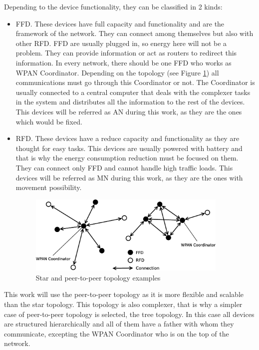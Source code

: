 Depending to the device functionality, they can be classified in 2 kinds:

\begin{itemize}
 \item \acl{FFD}. These devices have full capacity and functionality and are the framework of the network. They can connect 
among themselves but also with other \ac{RFD}. \ac{FFD} are usually plugged in, so energy here will not be a problem. They can provide 
information or act as routers to redirect this information. In every network, there should be one \ac{FFD} who works as \ac{WPAN}
Coordinator. Depending on the topology (see Figure \ref{fig:WPAN_Network_Topologies}) all communications must go through this 
Coordinator or not. The Coordinator is usually connected to a central computer that deals with the complexer tasks in the system 
and distributes all the information to the rest of the devices. This devices will be referred as \ac{AN} during this work, as they
are the ones which would be fixed.
 \item \acl{RFD}. These devices have a reduce capacity and functionality as they are thought for easy tasks. This devices are
usually powered with battery and that is why the energy consumption reduction must be focused on them. They can connect only
\ac{FFD} and cannot handle high traffic loads. This devices will be referred as \ac{MN} during this work, as they are the ones with 
movement possibility.

\vspace*{1cm}

\begin{figure}[ht]
 \begin{center}
  \includegraphics[width=0.9\textwidth]{WPAN_Network_Topologies.eps}
 \end{center}
 \caption{Star and peer-to-peer topology examples \cite{IEEE802.15.4-2006}}
 \label{fig:WPAN_Network_Topologies}
\end{figure}
\end{itemize}
This work will use the peer-to-peer topology as it is more flexible and scalable than the star topology. This topology is also
complexer, that is why a simpler case of peer-to-peer topology is selected, the tree topology. In this case all devices are
structured hierarchically and all of them have a father with whom they communicate, excepting the \ac{WPAN} Coordinator who is on the top of the network.

